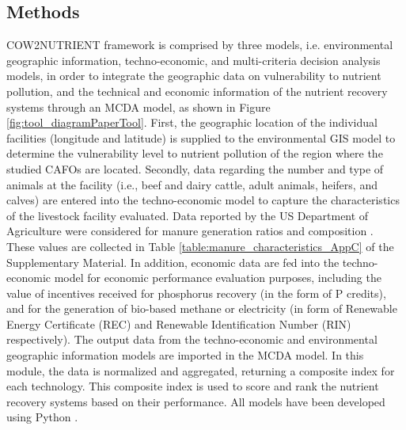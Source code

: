\begin{refsection}[referencesCh4]
\section{Methods}
COW2NUTRIENT framework is comprised by three models, i.e. environmental geographic information, techno-economic, and multi-criteria decision analysis models, in order to integrate the geographic data on vulnerability to nutrient pollution, and the technical and economic information of the nutrient recovery systems through an MCDA model, as shown in Figure \ref{fig:tool_diagramPaperTool}. First, the geographic location of the individual facilities (longitude and latitude) is supplied to the environmental GIS model to determine the vulnerability level to nutrient pollution of the region where the studied CAFOs are located. Secondly, data regarding the number and type of animals at the facility (i.e., beef and dairy cattle, adult animals, heifers, and calves) are entered into the techno-economic model to capture the characteristics of the livestock facility evaluated. Data reported by the US Department of Agriculture were considered for manure generation ratios \citep{Kellog2010} and composition \citep{USDAHandbook}. These values are collected in Table \ref{table:manure_characteristics_AppC} of the Supplementary Material. In addition, economic data are fed into the techno-economic model for economic performance evaluation purposes, including the value of incentives received for phosphorus recovery (in the form of P credits), and for the generation of bio-based methane or electricity (in form of Renewable Energy Certificate (REC) and Renewable Identification Number (RIN) respectively). The output data from the techno-economic and environmental geographic information models are imported in the MCDA model. In this module, the data is normalized and aggregated, returning a composite index for each technology. This composite index is used to score and rank the nutrient recovery systems based on their performance. All models have been developed using Python \citep{Python}.



\end{refsection}
